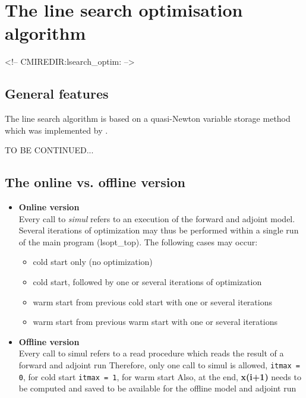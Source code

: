 \section{The line search optimisation algorithm
\label{sectionoptim}}
\begin{rawhtml}
<!-- CMIREDIR:lsearch_optim: -->
\end{rawhtml}

\subsection{General features}

The line search algorithm is based on a quasi-Newton
variable storage method which was implemented by
\cite{gil-lem:89}.

TO BE CONTINUED...

\subsection{The online vs. offline version}

\begin{itemize}
%
\item {\bf Online version} \\
Every call to {\it simul} refers to an execution of the 
forward and adjoint model.
Several iterations of optimization may thus be performed within
a single run of the main program (lsopt\_top).
The following cases may occur:
%
\begin{itemize}
\item
cold start only (no optimization)
\item
cold start, followed by one or several iterations of optimization
\item
warm start from previous cold start with one or several iterations
\item
warm start from previous warm start with one or several iterations
\end{itemize}
%
\item {\bf Offline version} \\
Every call to simul refers to a read procedure which
reads the result of a forward and adjoint run
Therefore, only one call to simul is allowed,
                     {\tt itmax = 0}, for cold start
                     {\tt itmax = 1}, for warm start
Also, at the end, {\bf x(i+1)} needs to be computed and saved
to be available for the offline model and adjoint run
\end{itemize}

